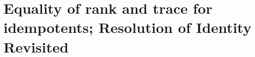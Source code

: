 \documentclass{book}
\theoremstyle{definition}
\begin{document}
\section{Equality of rank and trace for idempotents; Resolution of Identity Revisited}
\end{document}
